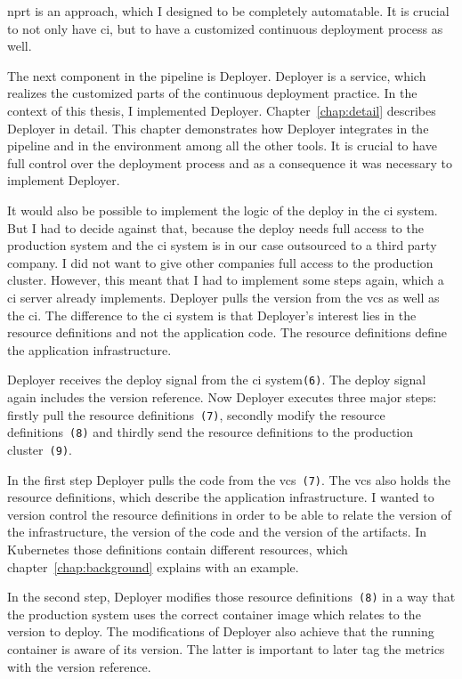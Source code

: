 \gls{nprt} is an approach, which I designed to be completely automatable. It is crucial to
not only have \gls{ci}, but to have a customized continuous deployment process as well.

The next component in the pipeline is Deployer. Deployer is a service, which realizes the
customized parts of the continuous deployment practice. In the context of this thesis, I
implemented Deployer. Chapter~\ref{chap:detail} describes Deployer in detail. This chapter
demonstrates how Deployer integrates in the pipeline and in the environment among all the
other tools. It is crucial to have full control over the deployment process and as a
consequence it was necessary to implement Deployer.

It would also be possible to implement the logic of the deploy in the \gls{ci} system. But
I had to decide against that, because the deploy needs full access to the production
system and the \gls{ci} system is in our case outsourced to a third party company. I did
not want to give other companies full access to the production cluster. However, this
meant that I had to implement some steps again, which a \gls{ci} server already
implements. Deployer pulls the version from the \gls{vcs} as well as the \gls{ci}. The
difference to the \gls{ci} system is that Deployer's interest lies in the resource
definitions and not the application code. The resource definitions define the application
infrastructure.

Deployer receives the deploy signal from the \gls{ci} system\texttt{(6)}. The deploy
signal again includes the version reference. Now Deployer executes three major steps:
firstly pull the resource definitions~\texttt{(7)}, secondly modify the resource
definitions~\texttt{(8)} and thirdly send the resource definitions to the production
cluster~\texttt{(9)}.

In the first step Deployer pulls the code from the \gls{vcs}~\texttt{(7)}. The \gls{vcs}
also holds the resource definitions, which describe the application infrastructure. I
wanted to version control the resource definitions in order to be able to relate the
version of the infrastructure, the version of the code and the version of the
artifacts. In Kubernetes those definitions contain different resources, which
chapter~\ref{chap:background} explains with an example.

In the second step, Deployer modifies those resource definitions~\texttt{(8)} in a way
that the production system uses the correct container image which relates to the version
to deploy. The modifications of Deployer also achieve that the running container is aware
of its version. The latter is important to later tag the metrics with the version
reference.

